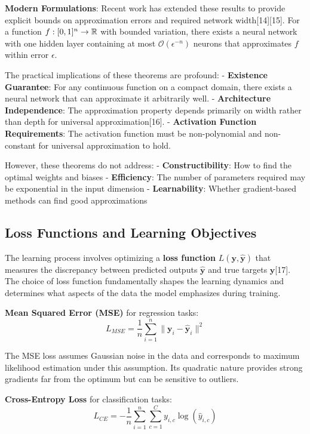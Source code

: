\documentclass[11pt,a4paper]{report}
\begin{document}
\textbf{Modern Formulations}: Recent work has extended these results to provide explicit bounds on approximation errors and required network width[14][15]. For a function $f: [0,1\relax]^n \rightarrow \mathbb{R}$ with bounded variation, there exists a neural network with one hidden layer containing at most $\mathcal{O}(\epsilon^{-n})$ neurons that approximates $f$ within error $\epsilon$.

The practical implications of these theorems are profound:
- \textbf{Existence Guarantee}: For any continuous function on a compact domain, there exists a neural network that can approximate it arbitrarily well.
- \textbf{Architecture Independence}: The approximation property depends primarily on width rather than depth for universal approximation[16].
- \textbf{Activation Function Requirements}: The activation function must be non-polynomial and non-constant for universal approximation to hold.

However, these theorems do not address:
- \textbf{Constructibility}: How to find the optimal weights and biases
- \textbf{Efficiency}: The number of parameters required may be exponential in the input dimension
- \textbf{Learnability}: Whether gradient-based methods can find good approximations

\subsection{Loss Functions and Learning Objectives}

The learning process involves optimizing a \textbf{loss function} $L(\mathbf{y}, \hat{\mathbf{y}})$ that measures the discrepancy between predicted outputs $\hat{\mathbf{y}}$ and true targets $\mathbf{y}$[17]. The choice of loss function fundamentally shapes the learning dynamics and determines what aspects of the data the model emphasizes during training.

\textbf{Mean Squared Error (MSE)} for regression tasks:
\begin{equation}
L_{MSE} = \frac{1}{n} \sum_{i=1}^{n} \|\mathbf{y}_i - \hat{\mathbf{y}}_i\|^2
\end{equation}

The MSE loss assumes Gaussian noise in the data and corresponds to maximum likelihood estimation under this assumption. Its quadratic nature provides strong gradients far from the optimum but can be sensitive to outliers.

\textbf{Cross-Entropy Loss} for classification tasks:
\begin{equation}
L_{CE} = -\frac{1}{n} \sum_{i=1}^{n} \sum_{c=1}^{C} y_{i,c} \log(\hat{y}_{i,c})
\end{equation}
\end{document}
